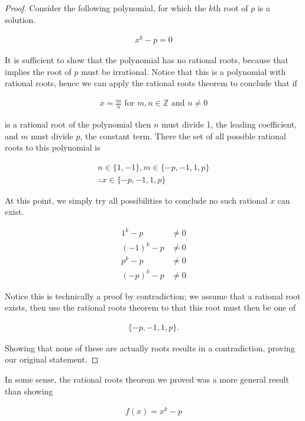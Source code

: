 \documentclass[twoside]{report}
\begin{document}
\begin{proof}
	Consider the following polynomial, for which the $k$th root of $p$ is a solution. 

	\begin{align*}
		x^k - p = 0
	\end{align*}

	It is sufficient to show that the polynomial has no rational roots, because that implies the root of $p$ must be irrational. Notice that this is a polynomial with rational roots, hence we can apply the rational roots theorem to conclude that if
	
	\begin{align*}
		x = \frac{m}{n} \text{ for } m, n \in \mathbb{Z} \text{ and } n \neq 0
	\end{align*}
	
	is a rational root of the polynomial then $n$ must divide 1, the leading coefficient, and $m$ must divide $p$, the constant term. There the set of all possible rational roots to this polynomial is
	
	\begin{align*}
		n \in \{ 1, -1 \}, m \in \{ -p, -1, 1, p \} \\
		\therefore x \in \{ -p, -1, 1, p \}
	\end{align*}
	
	At this point, we simply try all possibilities to conclude no such rational $x$ can exist.
	
	\begin{align*}
		1^k - p &\neq 0 \\
		(-1)^k - p &\neq 0 \\
		p^k - p &\neq 0 \\
		(-p)^k - p &\neq 0
	\end{align*}
	
	Notice this is technically a proof by contradiction; we assume that a rational root exists, then use the rational roots theorem to that this root must then be one of
	
	\begin{align*}
		\{ -p, -1, 1, p \}.
	\end{align*}
	
	Showing that none of these are actually roots results in a contradiction, proving our original statement.
\end{proof}

In some sense, the rational roots theorem we proved was a more general result than showing

\begin{align*}
	f(x) = x^k - p
\end{align*}
\end{document}
